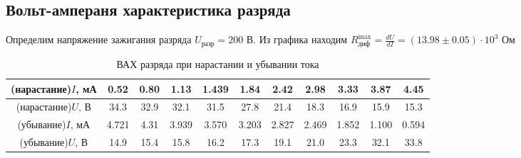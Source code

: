 \subsection*{\normalsize{Вольт-ампераня характеристика разряда}}
\normalsize{Определим напряжение зажигания разряда $U_{\text{разр}} = 200$ В. Из графика находим $R_{\text{диф}}^{\text{max}} = \frac{dU}{dI} = (13.98 \pm 0.05)\cdot 10^{3}$ Ом}
\begin{table}[h!]
    \centering
    \begin{tabular}{|c|c|c|c|c|c|c|c|c|c|c|}
        \hline
        (нарастание)$I$, мА & 0.52& 0.80& 1.13& 1.439& 1.84& 2.42& 2.98& 3.33& 3.87& 4.45\\\hline
        (нарастание)$U$, В & 34.3& 32.9& 32.1& 31.5& 27.8& 21.4& 18.3& 16.9& 15.9& 15.3\\\hline

        (убывание)$I$, мА & 4.721& 4.31& 3.939& 3.570& 3.203& 2.827& 2.469& 1.852& 1.100& 0.594\\\hline
        (убывание)$U$, В & 14.9& 15.4& 15.8& 16.2& 17.3& 19.1& 21.0& 23.3& 32.1& 33.8\\\hline
    \end{tabular}
    \caption{ВАХ разряда при нарастании и убывании тока}
\end{table}

\newpage
